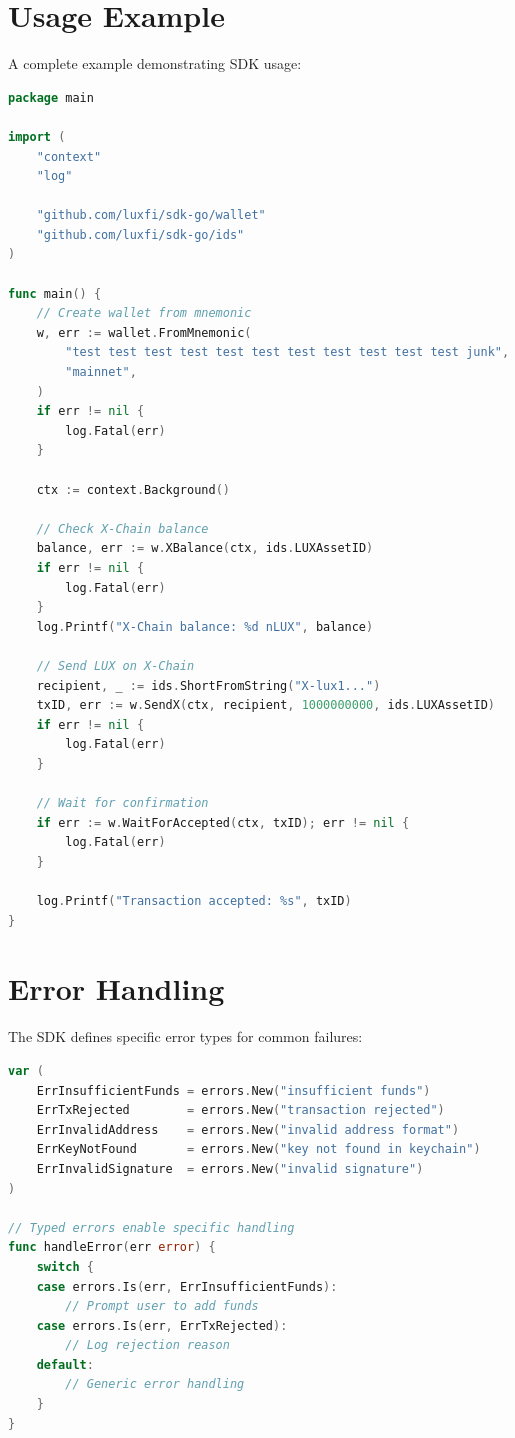 \documentclass[11pt,twocolumn]{article}
\begin{document}
\section{Usage Example}

A complete example demonstrating SDK usage:

\begin{lstlisting}[language=Go,caption=Complete Example]
package main

import (
    "context"
    "log"

    "github.com/luxfi/sdk-go/wallet"
    "github.com/luxfi/sdk-go/ids"
)

func main() {
    // Create wallet from mnemonic
    w, err := wallet.FromMnemonic(
        "test test test test test test test test test test test junk",
        "mainnet",
    )
    if err != nil {
        log.Fatal(err)
    }

    ctx := context.Background()

    // Check X-Chain balance
    balance, err := w.XBalance(ctx, ids.LUXAssetID)
    if err != nil {
        log.Fatal(err)
    }
    log.Printf("X-Chain balance: %d nLUX", balance)

    // Send LUX on X-Chain
    recipient, _ := ids.ShortFromString("X-lux1...")
    txID, err := w.SendX(ctx, recipient, 1000000000, ids.LUXAssetID)
    if err != nil {
        log.Fatal(err)
    }

    // Wait for confirmation
    if err := w.WaitForAccepted(ctx, txID); err != nil {
        log.Fatal(err)
    }

    log.Printf("Transaction accepted: %s", txID)
}
\end{lstlisting}

\section{Error Handling}

The SDK defines specific error types for common failures:

\begin{lstlisting}[language=Go,caption=Error Types]
var (
    ErrInsufficientFunds = errors.New("insufficient funds")
    ErrTxRejected        = errors.New("transaction rejected")
    ErrInvalidAddress    = errors.New("invalid address format")
    ErrKeyNotFound       = errors.New("key not found in keychain")
    ErrInvalidSignature  = errors.New("invalid signature")
)

// Typed errors enable specific handling
func handleError(err error) {
    switch {
    case errors.Is(err, ErrInsufficientFunds):
        // Prompt user to add funds
    case errors.Is(err, ErrTxRejected):
        // Log rejection reason
    default:
        // Generic error handling
    }
}
\end{lstlisting}
\end{document}

